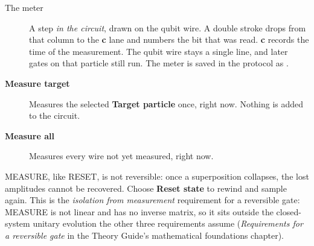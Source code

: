 \begin{beginnerbox}
\begin{description}
  \item[The meter] A step \emph{in the circuit}, drawn on the qubit wire.
  A double stroke drops from that column to the \textbf{c} lane and numbers
  the bit that was read. \textbf{c} records the time of the measurement.
  The qubit wire stays a single line, and later gates on that particle still
  run. The meter is saved in the protocol as .
  \item[\textbf{Measure target}] Measures the selected \textbf{Target
  particle} once, right now. Nothing is added to the circuit.
  \item[\textbf{Measure all}] Measures every wire not yet measured, right now.
\end{description}
MEASURE, like RESET, is not reversible: once a superposition collapses, the
lost amplitudes cannot be recovered. Choose \textbf{Reset state} to rewind and
sample again. This is the \emph{isolation from measurement} requirement for a
reversible gate: MEASURE is not linear and has no inverse matrix, so it sits
outside the closed-system unitary evolution the other three requirements
assume (\emph{Requirements for a reversible gate} in the Theory Guide's
mathematical foundations chapter).
\end{beginnerbox}

